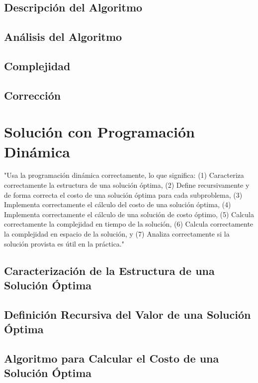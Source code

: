 \documentclass[letterpaper,10pt]{article}
\begin{document}
\subsection{Descripción del Algoritmo}
\label{subsec:descripcion_algoritmo_voraz}
\subsection{Análisis del Algoritmo}
\label{subsec:analisis_algoritmo_voraz}
\subsection{Complejidad}
\label{subsec:complejidad_algoritmo_voraz}
\subsection{Corrección}
\label{subsec:correccion_algoritmo_voraz}

\section{Solución con Programación Dinámica}
\label{sec:programacion_dinamica}
"Usa la programación dinámica correctamente, lo que significa: (1) Caracteriza correctamente la estructura de una solución óptima, (2) Define recursivamente y de forma correcta el costo de una solución óptima para cada subproblema, (3) Implementa correctamente el cálculo del costo de una solución óptima, (4) Implementa correctamente el cálculo de una solución de costo óptimo, (5) Calcula correctamente la complejidad en tiempo de la solución, (6) Calcula correctamente la complejidad en espacio de la solución, y (7) Analiza correctamente si la solución provista es útil en la práctica."
\subsection{Caracterización de la Estructura de una Solución Óptima}
\label{subsec:caracterizacion_solucion_optima}
\subsection{Definición Recursiva del Valor de una Solución Óptima}
\label{subsec:definicion_solucion_optima}
\subsection{Algoritmo para Calcular el Costo de una Solución Óptima}
\label{subsec:algoritmo_costo_solucion_optima}
\end{document}

